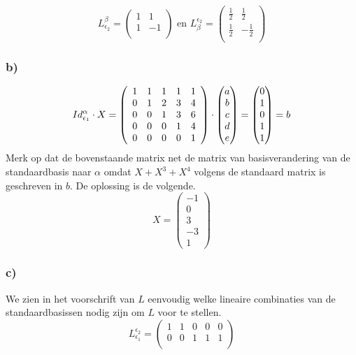 \documentclass[lineaire_algebra_oplossingen.tex]{subfiles}
\begin{document}
\[
L_{\epsilon_{2}}^\beta =
\begin{pmatrix}
1 & 1\\ 
1 & -1\\
\end{pmatrix}
\text{ en }
L_\beta^{\epsilon_{2}} =
\begin{pmatrix}
\frac{1}{2} & \frac{1}{2}\\ 
\frac{1}{2} & -\frac{1}{2}\\ 
\end{pmatrix}
\]

\subsubsection*{b)}
\[
Id_{\epsilon_1}^\alpha\cdot X  =
\left(
\begin{array}{c c c c c}
1 & 1 & 1 & 1 & 1\\ 
0 & 1 & 2 & 3 & 4\\ 
0 & 0 & 1 & 3 & 6\\ 
0 & 0 & 0 & 1 & 4\\ 
0 & 0 & 0 & 0 & 1\\ 
\end{array}
\right)
\cdot 
\begin{pmatrix}
a\\b\\c\\d\\e
\end{pmatrix}
=
\begin{pmatrix}
0\\1\\0\\1\\1
\end{pmatrix}
=
b
\]
Merk op dat de bovenstaande matrix net de matrix van basisverandering van de standaardbasis naar $\alpha$ omdat $X+X^3+X^4$ volgens de standaard matrix is geschreven in $b$.
De oplossing is de volgende.
\[
X = 
\begin{pmatrix}
-1 \\ 0 \\ 3 \\ -3 \\ 1
\end{pmatrix}
\]

\subsubsection*{c)}
We zien in het voorschrift van $L$ eenvoudig welke lineaire combinaties van de standaardbasissen nodig zijn om $L$ voor te stellen.
\[
L_{\epsilon_{1}}^{\epsilon_2}=
\begin{pmatrix}
1 & 1 & 0 & 0 & 0\\
0 & 0 & 1 & 1 & 1\\
\end{pmatrix}
\]
\end{document}
